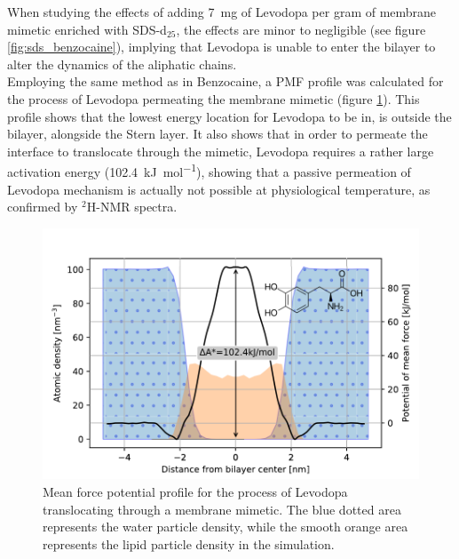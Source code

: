 \documentclass[3p,preprint,review]{elsarticle}
\begin{document}
	When studying the
	effects of adding \SI{7}{mg} of Levodopa per gram of membrane mimetic enriched
	with SDS-d$_{25}$, the effects are minor to negligible (see figure
	\ref{fig:sds_benzocaine}),
	implying that Levodopa is unable to enter the bilayer to alter
	the dynamics of the aliphatic chains.\\
	Employing the same method as in Benzocaine, a PMF profile was calculated for
	the
	process of Levodopa permeating the membrane mimetic (figure
	\ref{fig:levodopa_profile}). This profile shows that the lowest
	energy location for Levodopa to be in, is outside the bilayer, alongside the
	Stern
	layer.
	It also shows that in order to permeate the interface to translocate through
	the mimetic, Levodopa requires a rather
	large activation energy (\SI{102.4}{\kilo\joule\per\mol}), showing that a
	passive permeation of Levodopa mechanism is actually not possible at
	physiological temperature, as confirmed by $^2$H-NMR spectra. 
	\begin{figure}[htb]
		\centering
		\includegraphics[width=\columnwidth]{ldopa_profile_density}    
		\caption{Mean force potential profile for the process of Levodopa
			translocating through a membrane mimetic. The blue dotted area represents
			the water particle density, while the smooth orange area represents the
			lipid particle density in the simulation.}
		\label{fig:levodopa_profile}
	\end{figure}
	
	
	
\end{document}
